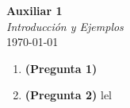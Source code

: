 \documentclass{article}
\begin{document}


\begin{center}
    \Huge{\textbf{Auxiliar 1}}\\
\textit{\large{Introducción y Ejemplos}}\\
    \normalsize
    \today
\end{center}

\begin{enumerate}
	\item \textbf{(Pregunta 1)}
	\item \textbf{(Pregunta 2)} lel
\end{enumerate}
\end{document}
